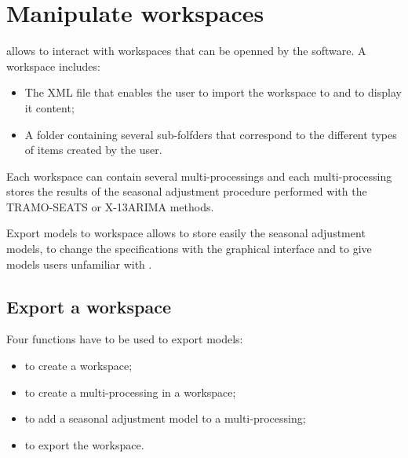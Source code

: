 \documentclass[article]{jss}
\providecommand{\tightlist}{%
  \setlength{\itemsep}{0pt}\setlength{\parskip}{0pt}}
\begin{document}
\hypertarget{manipulate-workspace}{%
\section[Manipulate JDemetra+ workspaces]{Manipulate  workspaces}\label{manipulate-workspace}}

 allows to interact with  workspaces
that can be openned by the software. A workspace includes:

\begin{itemize}
\tightlist
\item
  The XML file that enables the user to import the workspace to
   and to display it content;\\
\item
  A folder containing several sub-folfders that correspond to the
  different types of items created by the user.
\end{itemize}

Each workspace can contain several multi-processings and each
multi-processing stores the results of the seasonal adjustment procedure
performed with the TRAMO-SEATS or X-13ARIMA methods.

Export models to workspace allows to store easily the seasonal
adjustment models, to change the specifications with the
 graphical interface and to give models users
unfamiliar with .

\hypertarget{export-wk}{%
\subsection{Export a workspace}\label{export-wk}}

Four functions have to be used to export models:

\begin{itemize}
\tightlist
\item
   to create a workspace;\\
\item
   to create a multi-processing in a
  workspace;\\
\item
   to add a seasonal adjustment model to a
  multi-processing;\\
\item
   to export the workspace.
\end{itemize}
\end{document}
